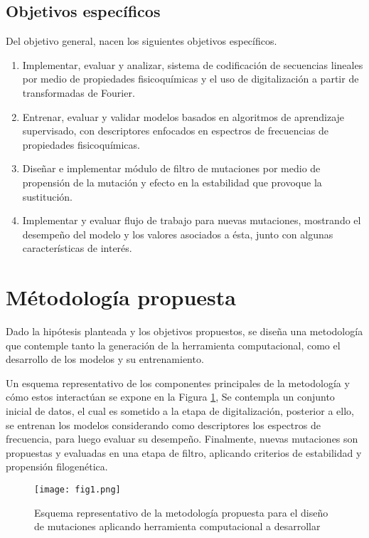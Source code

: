 \subsection{Objetivos específicos}

Del objetivo general, nacen los siguientes objetivos específicos.

\begin{enumerate}
	
	\item Implementar, evaluar y analizar, sistema de codificación de secuencias lineales por medio de propiedades fisicoquímicas y el uso de digitalización a partir de transformadas de Fourier.
	\item Entrenar, evaluar y validar modelos basados en algoritmos de aprendizaje supervisado, con descriptores enfocados en espectros de frecuencias de propiedades fisicoquímicas.
	\item Diseñar e implementar módulo de filtro de mutaciones por medio de propensión de la mutación y efecto en la estabilidad que provoque la sustitución.
	\item Implementar y evaluar flujo de trabajo para nuevas mutaciones, mostrando el desempeño del modelo y los valores asociados a ésta, junto con algunas características de interés.
	
\end{enumerate}

\section{Métodología propuesta}

Dado la hipótesis planteada y los objetivos propuestos, se diseña una metodología que contemple tanto la generación de la herramienta computacional, como el desarrollo de los modelos y su entrenamiento.

Un esquema representativo de los componentes principales de la metodología y cómo estos interactúan se expone en la Figura \ref{cap4:fig1}, Se contempla un conjunto inicial de datos, el cual es sometido a la etapa de digitalización, posterior a ello, se entrenan los modelos considerando como descriptores los espectros de frecuencia, para luego evaluar su desempeño. Finalmente, nuevas mutaciones son propuestas y evaluadas en una etapa de filtro, aplicando criterios de estabilidad y propensión filogenética.

\begin{figure}[!h]
	
	\centering
	\texttt{[image: fig1.png]}
	\caption{Esquema representativo de la metodología propuesta para el diseño de mutaciones aplicando herramienta computacional a desarrollar}
	\label{cap4:fig1}
\end{figure}

